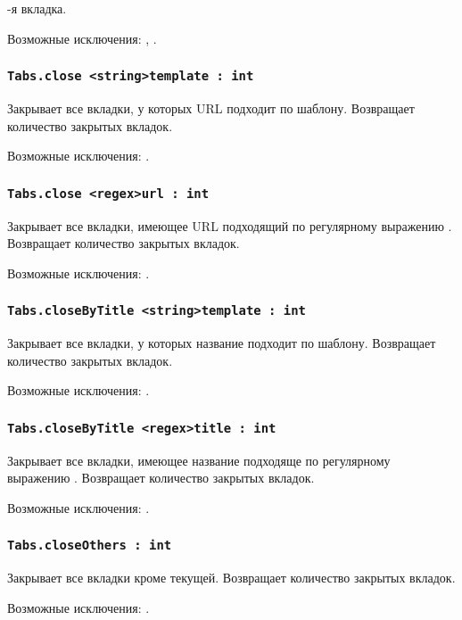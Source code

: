 -я вкладка.

Возможные исключения: , .

\subsubsection{\lstinline|Tabs.close <string>template : int|}

Закрывает все вкладки, у которых URL подходит по шаблону. Возвращает количество закрытых вкладок.

Возможные исключения: .

\subsubsection{\lstinline|Tabs.close <regex>url : int|}

Закрывает все вкладки, имеющее URL подходящий по регулярному выражению . Возвращает количество закрытых вкладок.

Возможные исключения: .

\subsubsection{\lstinline|Tabs.closeByTitle <string>template : int|}

Закрывает все вкладки, у которых название подходит по шаблону. Возвращает количество закрытых вкладок.

Возможные исключения: .

\subsubsection{\lstinline|Tabs.closeByTitle <regex>title : int|}

Закрывает все вкладки, имеющее название подходяще по регулярному выражению . Возвращает количество закрытых вкладок.

Возможные исключения: .

\subsubsection{\lstinline|Tabs.closeOthers : int|}

Закрывает все вкладки кроме текущей. Возвращает количество закрытых вкладок.

Возможные исключения: .

